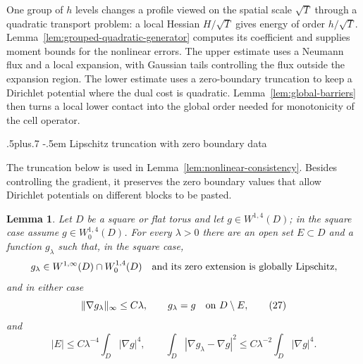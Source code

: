 \documentclass[11pt,reqno]{amsart}
\makeatletter
\def\subsection{\@startsection{subsection}{2}{0pt}%
  {.5\linespacing plus.7\linespacing}
  {-.5em}
  {\normalfont\scshape}}
\theoremstyle{plain}
\newtheorem{lemma}[theorem]{Lemma}
\theoremstyle{definition}
\theoremstyle{remark}
\numberwithin{equation}{section}
\newcommand{\1}{\mathbf 1}
\makeatother
\begin{document}
One group of $h$ levels changes a profile viewed on the spatial scale
$\sqrt T$ through a quadratic transport problem: a local Hessian
$H/\sqrt T$ gives energy of order $h/\sqrt T$.
Lemma~\ref{lem:grouped-quadratic-generator} computes its coefficient
and supplies moment bounds for the nonlinear errors.  The upper estimate
uses a Neumann flux and a local expansion, with Gaussian tails controlling
the flux outside the expansion region.  The lower estimate uses a
zero-boundary truncation to keep a Dirichlet potential where the dual
cost is quadratic.  Lemma~\ref{lem:global-barriers} then turns a local
lower contact into the global order needed for monotonicity of the cell
operator.

\subsection{Lipschitz truncation with zero boundary data}

The truncation below is used in Lemma~\ref{lem:nonlinear-consistency}.
Besides controlling the gradient, it preserves the zero boundary values
that allow Dirichlet potentials on different blocks to be pasted.

\begin{lemma}\label{lem:lipschitz-truncation}
Let $D$ be a square or flat torus and let $g\in W^{1,4}(D)$; in the
square case assume $g\in W^{1,4}_ 0(D)$.  For every $\lambda>0$ there
are an open set $E\subset D$ and a function $g_ \lambda$ such that, in
the square case,
\begin{equation*}
g_ \lambda\in W^{1,\infty}(D)\cap W^{1,4}_ 0(D)
\quad\hbox{and its zero extension is globally Lipschitz},
\end{equation*}
and in either case
\begin{equation}
\|\nabla g_ \lambda\|_ \infty\leq C\lambda,\qquad
g_ \lambda=g\quad\hbox{on }D\setminus E,
\tag{27}
\end{equation}
and
\begin{equation}
|E|\leq C\lambda^{-4}\int_ D|\nabla g|^4,
\qquad
\int_ D|\nabla g_ \lambda-\nabla g|^2
\leq C\lambda^{-2}\int_ D|\nabla g|^4.
\tag{28}
\end{equation}

\end{lemma}
\end{document}
